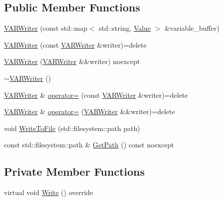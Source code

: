 \subsection*{Public Member Functions}
\begin{DoxyCompactItemize}
\item 
\mbox{\hyperlink{classmage_1_1loader_1_1_v_a_r_writer_a8a90d694b8c6db85e36490005bdb546c}{V\+A\+R\+Writer}} (const std\+::map$<$ std\+::string, \mbox{\hyperlink{namespacemage_a68ae02d3a746ed2f285aa2b10f131a21}{Value}} $>$ \&variable\+\_\+buffer)
\item 
\mbox{\hyperlink{classmage_1_1loader_1_1_v_a_r_writer_a5ddb3fcd75952ecc8593bc284dc3db0e}{V\+A\+R\+Writer}} (const \mbox{\hyperlink{classmage_1_1loader_1_1_v_a_r_writer}{V\+A\+R\+Writer}} \&writer)=delete
\item 
\mbox{\hyperlink{classmage_1_1loader_1_1_v_a_r_writer_ab8a676252c909a6f8914d786048de255}{V\+A\+R\+Writer}} (\mbox{\hyperlink{classmage_1_1loader_1_1_v_a_r_writer}{V\+A\+R\+Writer}} \&\&writer) noexcept
\item 
\mbox{\hyperlink{classmage_1_1loader_1_1_v_a_r_writer_af908fe01c6754dabec6ed3c45b852b3b}{$\sim$\+V\+A\+R\+Writer}} ()
\item 
\mbox{\hyperlink{classmage_1_1loader_1_1_v_a_r_writer}{V\+A\+R\+Writer}} \& \mbox{\hyperlink{classmage_1_1loader_1_1_v_a_r_writer_a6ffe21455dfc82f8d829d9cabe59ba53}{operator=}} (const \mbox{\hyperlink{classmage_1_1loader_1_1_v_a_r_writer}{V\+A\+R\+Writer}} \&writer)=delete
\item 
\mbox{\hyperlink{classmage_1_1loader_1_1_v_a_r_writer}{V\+A\+R\+Writer}} \& \mbox{\hyperlink{classmage_1_1loader_1_1_v_a_r_writer_aef0efc3b6d9ca8c0da5e45063da01365}{operator=}} (\mbox{\hyperlink{classmage_1_1loader_1_1_v_a_r_writer}{V\+A\+R\+Writer}} \&\&writer)=delete
\item 
void \mbox{\hyperlink{classmage_1_1loader_1_1_v_a_r_writer_ac01e930b55888da88e345b0910d4b1c2}{Write\+To\+File}} (std\+::filesystem\+::path path)
\item 
const std\+::filesystem\+::path \& \mbox{\hyperlink{classmage_1_1loader_1_1_v_a_r_writer_ab023ae8174132f233c6e1fa4d3a2a1c8}{Get\+Path}} () const noexcept
\end{DoxyCompactItemize}
\subsection*{Private Member Functions}
\begin{DoxyCompactItemize}
\item 
virtual void \mbox{\hyperlink{classmage_1_1loader_1_1_v_a_r_writer_af2bbf94353f1b4b01aa56e8dd9c89d7f}{Write}} () override
\end{DoxyCompactItemize}
